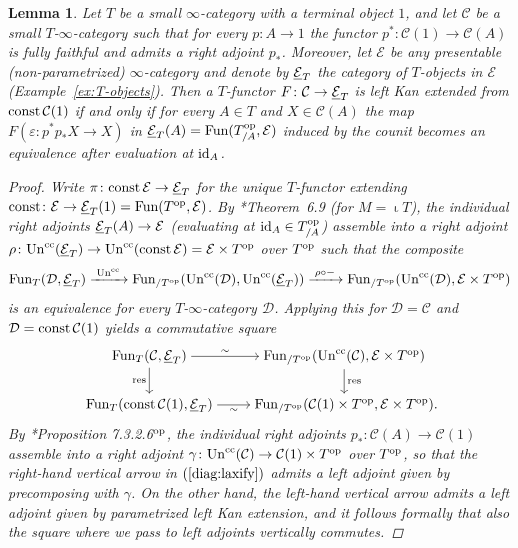 \documentclass[reqno]{memo-l}
\theoremstyle{mythm}
\newtheorem{lemma}[thm]{Lemma}
\theoremstyle{definition}
\numberwithin{equation}{section}
\newcommand{\Cc}{{\mathcal{C}}}
\newcommand{\Dd}{{\mathcal{D}}}
\newcommand{\Ee}{{\mathcal{E}}}
\renewcommand{\epsilon}{\varepsilon}
\newcommand{\Fun}{{\textup{Fun}}}
\newcommand{\op}{{\textup{op}}}
\DeclareMathOperator{\core}{\iota}
\newcommand{\const}{\textup{const}}
\newcommand{\id}{\textup{id}}
\newcommand{\Un}{\textup{Un}}
\newcommand{\res}{\textup{res}}
\newcommand{\ulhelper}[2]{\underline{\setbox0=\hbox{$#1#2$}\dp0=0.4pt \box0\relax}}
\newcommand{\ul}[1]{{\mathpalette\ulhelper{#1}}\hbox{\rule[-2pt]{0pt}{0pt}}}
\newcommand{\cc}{\text{cc}}
\begin{document}
\begin{lemma}
    Let $T$ be a small $\infty$-category with a terminal object $1$, and let $\Cc$ be a small $T$-$\infty$-category such that for every $p\colon A\to1$ the functor $p^*\colon\Cc(1)\to\Cc(A)$ is fully faithful and admits a right adjoint $p_*$. Moreover, let $\Ee$ be any presentable (non-parametrized) $\infty$-category and denote by $\ul\Ee_T$ the category of $T$-objects in $\Ee$ (Example~\ref{ex:T-objects}). Then a $T$-functor $F\colon\Cc\to\ul\Ee_T$ is left Kan extended from $\const\,\Cc(1)$ if and only if for every $A\in T$ and $X\in\Cc(A)$ the map $F(\epsilon\colon p^*p_*X\to X)$ in $\ul\Ee_T(A)=\Fun(T_{/A}^\op,\Ee)$ induced by the counit becomes an equivalence after evaluation at $\id_A$.
    \begin{proof}
        Write $\pi\colon\const\,\Ee\to\ul\Ee_T$ for the unique $T$-functor extending $\const\colon\Ee\to\ul\Ee_T(1)=\Fun(T^\op,\Ee)$. By \cite{LLP}*{Theorem~6.9} (for $M=\core T$), the individual right adjoints $\ul\Ee_T(A)\to\Ee$ (evaluating at $\id_A\in T_{/A}^\op$) assemble into a right adjoint $\rho\colon\Un^\cc(\ul\Ee_T)\to\Un^\cc(\const\,\Ee)=\Ee\times T^\op$ over $T^\op$ such that the composite
        \[
            \Fun_T(\Dd,\ul\Ee_T)\xrightarrow{\;\Un^\cc\;}
            \Fun_{/T^\op}(\Un^\cc(\Dd),\Un^\cc(\ul\Ee_T))\xrightarrow{\;\rho\circ{-}\;}
            \Fun_{/T^\op}(\Un^\cc(\Dd),\Ee\times T^\op)
        \]        
        is an equivalence for every $T$-$\infty$-category $\Dd$. Applying this for $\Dd=\Cc$ and $\Dd=\const\,\Cc(1)$ yields a commutative square
        \begin{equation}\label{diag:laxify}
            \begin{tikzcd}[cramped]
                \Fun_T(\Cc,\ul\Ee_T)\arrow[r,"\sim"]\arrow[d,"\res"'] & \Fun_{/T^\op}(\Un^\cc(\Cc),\Ee\times T^\op)\arrow[d,"\res"]\\
                \Fun_T(\const\,\Cc(1),\ul\Ee_T)\arrow[r,"\sim"'] & \Fun_{/T^\op}(\Cc(1)\times T^\op,\Ee\times T^\op)\rlap.
            \end{tikzcd}
        \end{equation}
        By \cite{HA}*{Proposition 7.3.2.6${}^\op$}, the individual right adjoints $p_*\colon\Cc(A)\to\Cc(1)$ assemble into a right adjoint $\gamma\colon\Un^\cc(\Cc)\to\Cc(1)\times T^\op$ over $T^\op$, so that the right-hand vertical arrow in $(\ref{diag:laxify})$ admits a \emph{left} adjoint given by precomposing with $\gamma$. On the other hand, the left-hand vertical arrow admits a left adjoint given by parametrized left Kan extension, and it follows formally that also the square where we pass to left adjoints vertically commutes.


\end{proof}
\end{lemma}
\end{document}
